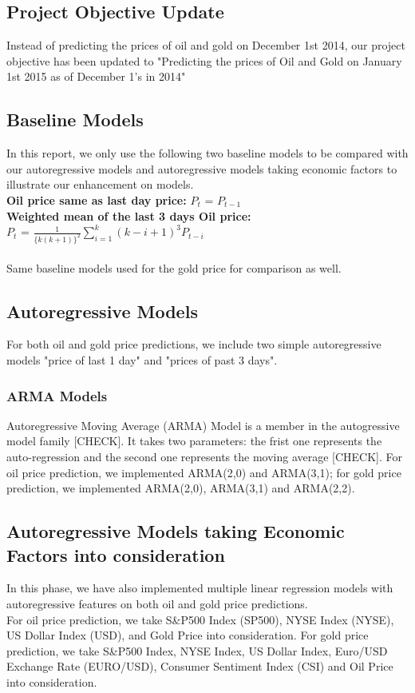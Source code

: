 \documentclass[runningheads]{llncs}
\begin{document}
\subsection{Project Objective Update}

Instead of predicting the prices of oil and gold on December 1st 2014, our project objective has been updated to "Predicting the prices of Oil and Gold on January 1st 2015 as of December 1's in 2014"

\subsection{Baseline Models}

In this report, we only use the following two baseline models to be compared with our autoregressive models and autoregressive models taking economic factors to illustrate our enhancement on models.\\

\noindent\textbf{Oil price same as last day price:} $P_{t}$ = $P_{t-1}$\\
\textbf{Weighted mean of the last 3 days Oil price:} \\
$P_{t}$ = $\frac{1}{\{k(k+1)\}^2}\sum\limits_{i=1}^k (k-i+1)^3P_{t-i}$\\
\\Same baseline models used for the gold price for comparison as well.

\subsection{Autoregressive Models}
For both oil and gold price predictions, we include two simple autoregressive models "price of last 1 day" and "prices of past 3 days".
\subsubsection{ARMA Models} 
Autoregressive Moving Average (ARMA) Model is a member in the autogressive model family [CHECK]. It takes two parameters: the frist one represents the auto-regression and the second one represents the moving average [CHECK]. For oil price prediction, we implemented ARMA(2,0) and ARMA(3,1); for gold price prediction, we implemented ARMA(2,0), ARMA(3,1) and ARMA(2,2).

\subsection{Autoregressive Models taking Economic Factors into consideration}
In this phase, we have also implemented multiple linear regression models with autoregressive features on both oil and gold price predictions. \\
For oil price prediction, we take S\&P500 Index (SP500), NYSE Index (NYSE), US Dollar Index (USD), and Gold Price into consideration. For gold price prediction, we take S\&P500 Index, NYSE Index, US Dollar Index, Euro/USD Exchange Rate (EURO/USD), Consumer Sentiment Index (CSI) and Oil Price into consideration.
\end{document}
